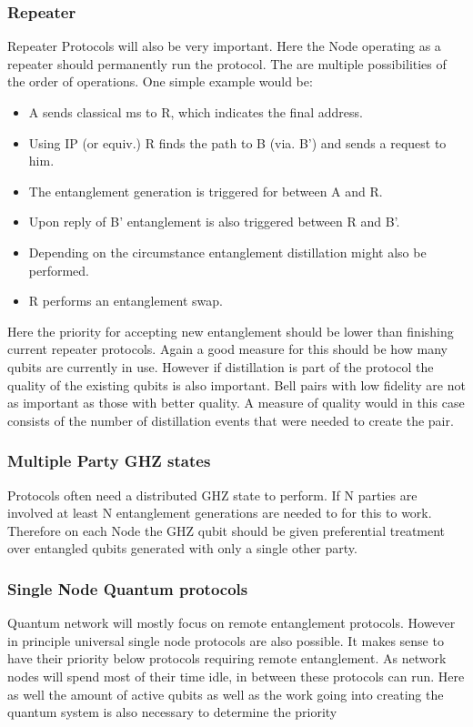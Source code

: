 \documentclass[]{article}
\begin{document}
\subsubsection{Repeater}
Repeater Protocols will also be very important. Here the Node operating as a repeater should permanently run the protocol. The are multiple possibilities of the order of operations. One simple example would be:
\begin{itemize}
	\item A sends classical ms to R, which indicates the final address. 
	\item Using IP (or equiv.) R finds the path to B (via. B') and sends a request to him.
	\item The entanglement generation is triggered for between A and R.
	\item Upon reply of B' entanglement is also triggered between R and B'.
	\item Depending on the circumstance entanglement distillation might also be performed.
	\item R performs an entanglement swap.
\end{itemize}
Here the priority for accepting new entanglement should be lower than finishing current repeater protocols. Again a good measure for this should be how many qubits are currently in use. However if distillation is part of the protocol the quality of the existing qubits is also important. Bell pairs with low fidelity are not as important as those with better quality. A measure of quality would in this case consists of the number of distillation events that were needed to create the pair. 
\subsubsection{Multiple Party GHZ states}
Protocols often need a distributed GHZ state to perform. If N parties are involved at least N entanglement generations are needed to for this to work. Therefore on each Node the GHZ qubit should be given preferential treatment over entangled qubits generated with only a single other party.
\subsubsection{Single Node Quantum protocols}
Quantum network will mostly focus on remote entanglement protocols. However in principle universal single node protocols are also possible. It makes sense to have their priority below protocols requiring remote entanglement. As network nodes will spend most of their time idle, in between these protocols can run. Here as well the amount of active qubits as well as the work going into creating the quantum system is also necessary to determine the priority
\end{document}
